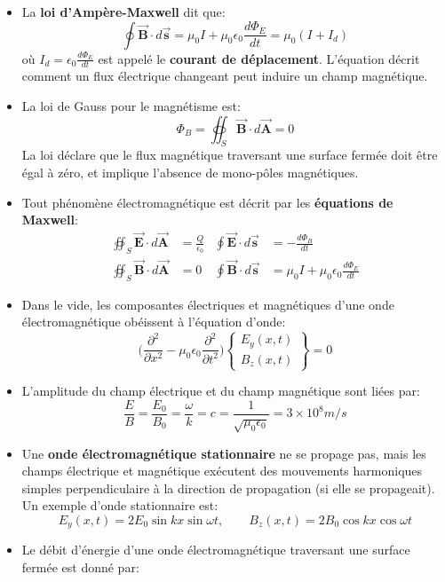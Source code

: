 \documentclass[a4paper]{article}
\begin{document}
\begin{itemize}
    \item La \textbf{loi d'Ampère-Maxwell} dit que: 
\[ \oint \vec{\textbf{B}} \cdot d \vec{\textbf{s}} = \mu_0 I + \mu_0 \epsilon_0 \frac{d \Phi_E}{d t} = \mu_0 (I + I_d) \]
où $\displaystyle I_d = \epsilon_0 \frac{d \Phi_E}{d t} $ est appelé le \textbf{courant de déplacement}. L'équation décrit comment un flux électrique changeant peut induire un champ magnétique.
    \item La loi de Gauss pour le magnétisme est: 
\[ \Phi_B = \oiint_S \vec{\textbf{B}} \cdot d \vec{\textbf{A}} = 0 \]
La loi déclare que le flux magnétique traversant une surface fermée doit être égal à zéro, et implique l'absence de mono-pôles magnétiques.
    \item Tout phénomène électromagnétique est décrit par les \textbf{équations de Maxwell}: 
\begin{align*}
\oiint_S \vec{\textbf{E}} \cdot d \vec{\textbf{A}} &= \frac{Q}{\epsilon_0}  & \oint \vec{\textbf{E}} \cdot d \vec{\textbf{s}} &= - \frac{d \Phi_B}{d t} \\
\oiint_S \vec{\textbf{B}} \cdot d \vec{\textbf{A}} &= 0                     & \oint \vec{\textbf{B}} \cdot d \vec{\textbf{s}} &= \mu_0 I + \mu_0 \epsilon_0 \frac{d \Phi_E}{d t}
\end{align*}
    \item Dans le vide, les composantes électriques et magnétiques d'une onde électromagnétique obéissent à l'équation d'onde: 
\[ \bigg( \frac{\partial^2}{\partial x^2} - \mu_0 \epsilon_0 \frac{\partial^2}{\partial t^2} \bigg)
\begin{Bmatrix}
E_y (x, t) \\
B_z (x, t)
\end{Bmatrix} = 0 \]
    \item L'amplitude du champ électrique et du champ magnétique sont liées par: 
\[ \frac{E}{B} = \frac{E_0}{B_0} = \frac{\omega}{k} = c = \frac{1}{\sqrt{\mu_0 \epsilon_0}} = 3 \times 10^8 m / s \]
    \item Une \textbf{onde électromagnétique stationnaire} ne se propage pas, mais les champs électrique et magnétique exécutent des 
mouvements harmoniques simples perpendiculaire à la direction de propagation (si elle se propageait). Un exemple d'onde stationnaire est: 
\[ E_y(x, t) = 2 E_0 \sin k x \sin \omega t, \qquad B_z(x, t) = 2 B_0 \cos k x \cos \omega t \]
    \item Le débit d'énergie d'une onde électromagnétique traversant une surface fermée est donné par: 

\end{itemize}
\end{document}
